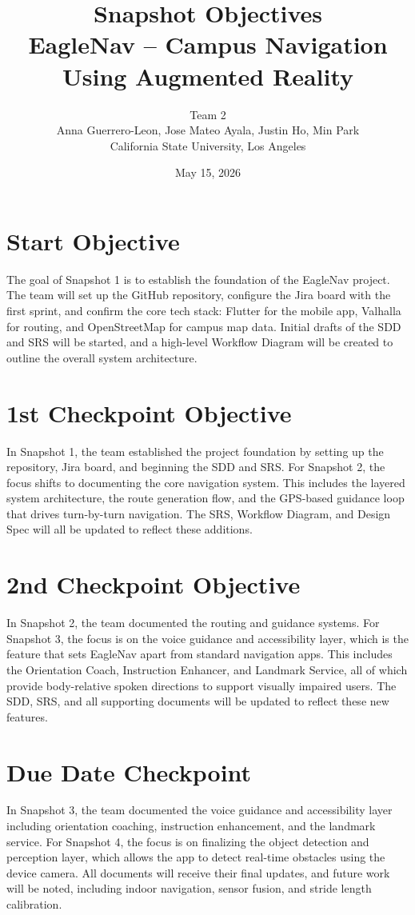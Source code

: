 \documentclass[12pt]{article}
\title{\textbf{Snapshot Objectives} \\ EagleNav -- Campus Navigation Using Augmented Reality}
\author{Team 2 \\
Anna Guerrero-Leon, Jose Mateo Ayala, Justin Ho, Min Park \\
California State University, Los Angeles}
\date{May 15, 2026}
\begin{document}
\maketitle
\newpage

\tableofcontents
\newpage

\section{Start Objective}

The goal of Snapshot 1 is to establish the foundation of the EagleNav project. The team will set up the GitHub repository, configure the Jira board with the first sprint, and confirm the core tech stack: Flutter for the mobile app, Valhalla for routing, and OpenStreetMap for campus map data. Initial drafts of the SDD and SRS will be started, and a high-level Workflow Diagram will be created to outline the overall system architecture.

\section{1st Checkpoint Objective}

In Snapshot 1, the team established the project foundation by setting up the repository, Jira board, and beginning the SDD and SRS. For Snapshot 2, the focus shifts to documenting the core navigation system. This includes the layered system architecture, the route generation flow, and the GPS-based guidance loop that drives turn-by-turn navigation. The SRS, Workflow Diagram, and Design Spec will all be updated to reflect these additions.

\section{2nd Checkpoint Objective}

In Snapshot 2, the team documented the routing and guidance systems. For Snapshot 3, the focus is on the voice guidance and accessibility layer, which is the feature that sets EagleNav apart from standard navigation apps. This includes the Orientation Coach, Instruction Enhancer, and Landmark Service, all of which provide body-relative spoken directions to support visually impaired users. The SDD, SRS, and all supporting documents will be updated to reflect these new features.

\section{Due Date Checkpoint}

In Snapshot 3, the team documented the voice guidance and accessibility layer including orientation coaching, instruction enhancement, and the landmark service. For Snapshot 4, the focus is on finalizing the object detection and perception layer, which allows the app to detect real-time obstacles using the device camera. All documents will receive their final updates, and future work will be noted, including indoor navigation, sensor fusion, and stride length calibration.
\end{document}
